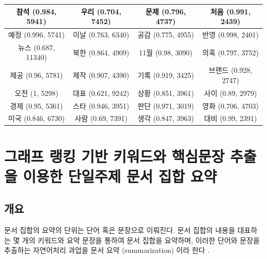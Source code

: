 \documentclass[11pt]{article}
\begin{document}
\begin{table}[H]
\begin{tabular}{|c|c|c|c|}
참석 (0.984, 5941) & 우리 (0.704, 7452) & 문제 (0.796, 4737) & 처음 (0.991, 2439) \\ \hline
예정 (0.996, 5741) & 이날 (0.763, 6340) & 공감 (0.775, 4955) & 반영 (0.998, 2401) \\ \hline
뉴스 (0.687, 11340) & 북한 (0.864, 4909) & 11월 (0.98, 3090) & 의혹 (0.797, 3752) \\ \hline
제공 (0.96, 5781) & 제작 (0.907, 4390) & 기록 (0.919, 3425) & 브랜드 (0.928, 2747) \\ \hline
오전 (1, 5298) & 대표 (0.621, 9242) & 상황 (0.851, 3961) & 사이 (0.89, 2979) \\ \hline
경제 (0.95, 5361) & 스타 (0.946, 3951) & 판단 (0.971, 3019) & 영화 (0.706, 4703) \\ \hline
미국 (0.846, 6730) & 사람 (0.69, 7391) & 생각 (0.847, 3963) & 대비 (0.99, 2391) \\ \hline
\end{tabular}%
\end{table}


\newpage
\section{그래프 랭킹 기반 키워드와 핵심문장 추출을 이용한 단일주제 문서 집합 요약} \label{summarize_single_topic}

\subsection{개요}

문서 집합의 요약의 단위는 단어 혹은 문장으로 이뤄진다.
문서 집합의 내용을 대표하는 몇 개의 키워드와 요약 문장을 통하여 문서 집합을 요약하며, 이러한 단어와 문장을 추출하는 자연어처리 과업을 문서 요약 (summarization) 이라 한다 \citep{yao2017recent}.
\end{document}
